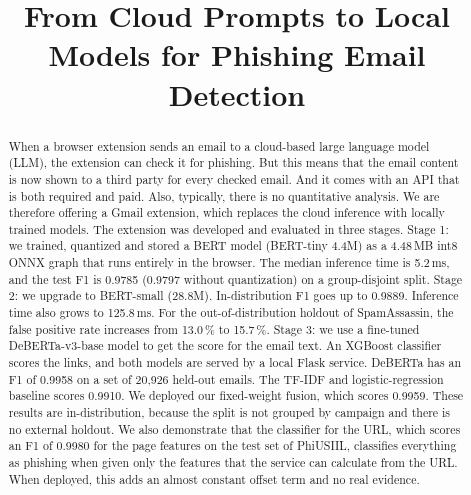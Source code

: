 \documentclass[conference]{IEEEtran}
\begin{document}
\title{From Cloud Prompts to Local Models for Phishing Email Detection}

\author{
}

\maketitle

\begin{abstract}
When a browser extension sends an email to a cloud-based large language model (LLM), the extension can check it for phishing. But this means that the email content is now shown to a third party for every checked email. And it comes with an API that is both required and paid. Also, typically, there is no quantitative analysis. We are therefore offering a Gmail extension, which replaces the cloud inference with locally trained models. The extension was developed and evaluated in three stages. Stage 1: we trained, quantized and stored a BERT model (BERT-tiny 4.4M) as a 4.48\,MB int8 ONNX graph that runs entirely in the browser. The median inference time is 5.2\,ms, and the test F1 is 0.9785 (0.9797 without quantization) on a group-disjoint split. Stage 2: we upgrade to BERT-small (28.8M). In-distribution F1 goes up to 0.9889. Inference time also grows to 125.8\,ms. For the out-of-distribution holdout of SpamAssassin, the false positive rate increases from 13.0\,\% to 15.7\,\%. Stage 3: we use a fine-tuned DeBERTa-v3-base model to get the score for the email text. An XGBoost classifier scores the links, and both models are served by a local Flask service. DeBERTa has an F1 of 0.9958 on a set of 20,926 held-out emails. The TF-IDF and logistic-regression baseline scores 0.9910. We deployed our fixed-weight fusion, which scores 0.9959. These results are in-distribution, because the split is not grouped by campaign and there is no external holdout. We also demonstrate that the classifier for the URL, which scores an F1 of 0.9980 for the page features on the test set of PhiUSIIL, classifies everything as phishing when given only the features that the service can calculate from the URL. When deployed, this adds an almost constant offset term and no real evidence.
\end{abstract}
\end{document}
